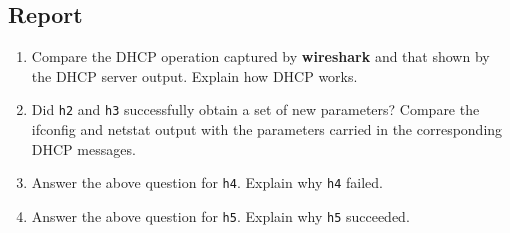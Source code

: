 \documentclass[10pt,a4paper]{article}
\numberwithin{equation}{section}
\numberwithin{figure}{section}
\numberwithin{table}{section}
\begin{document}
    \subsection*{Report}
    \begin{enumerate}
        \item Compare the DHCP operation captured by \textbf{wireshark} and that shown by the DHCP server output.
        Explain how DHCP works.
        \item Did \texttt{h2} and \texttt{h3} successfully obtain a set of new parameters?
        Compare the ifconfig and netstat output with the parameters carried in the corresponding DHCP messages.
        \item Answer the above question for \texttt{h4}.
        Explain why \texttt{h4} failed.
        \item Answer the above question for \texttt{h5}.
        Explain why \texttt{h5} succeeded.
    \end{enumerate}
\end{document}
